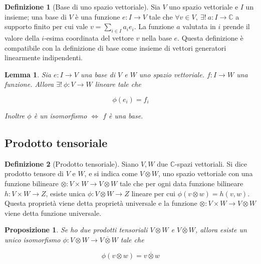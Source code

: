 \documentclass[11pt]{article}
\theoremstyle{plain}
\newtheorem{lemma}[thm]{Lemma}
\newtheorem{prop}[thm]{Proposizione}
\theoremstyle{definition}
\newtheorem{defn}{Definizione}[section]
\theoremstyle{remark}
\begin{document}
\begin{defn}[Base di uno spazio vettoriale]
Sia $V$ uno spazio vettoriale e $I$ un insieme; una base di $V$ è una funzione $e: I \to V$ tale che 
$\forall v \in V,\  \exists!\  a: I \to \mathbb{C}$ a supporto finito per cui vale $v=\sum_{i\in I}a_i e_i$. La funzione $a$ 
valutata in $i$ prende il valore della $i$-esima coordinata del vettore $v$ nella base $e$. Questa definizione è compatibile con la 
definizione di base come insieme di vettori generatori linearmente indipendenti.
\end{defn}


\begin{lemma}
 Sia $e:I\to V$ una base di $V$ e $W$ uno spazio vettoriale. $f: I \to W$ una funzione. Allora $\exists!\  \phi: V \to W$ lineare tale che

\[\phi(e_i) = f_i \]

Inoltre $\phi$ è un isomorfismo $\Leftrightarrow$ $f$ è una base.
\end{lemma}


\subsection{Prodotto tensoriale}


  


\begin{defn}[Prodotto tensoriale]
   Siano $V, W$ due $\mathbb{C}$-spazi vettoriali. Si dice prodotto tensore di $V$ e $W$, 
   e si indica come $V\otimes W$, uno spazio vettoriale con una funzione bilineare 
   $\otimes: V \times W \to V\otimes W$ tale che per ogni data funzione bilineare $h: V\times W \to  Z$,
   esiste unica $\phi: V\otimes W \to Z$ lineare per cui $\phi(v \otimes w)=h(v,w)$.
   Questa proprietà viene detta proprietà universale e la funzione $\otimes: V \times W \to V\otimes W$
   viene detta funzione universale.



\label{defn:prodotto tensoriale}
\end{defn}


\begin{prop}
Se ho due prodotti tensoriali $V \otimes W$ e $V \overline{\otimes} W$, allora esiste un unico isomorfismo 
$\phi: V \otimes W \to V \overline{\otimes} W$ tale che

\[ \phi (v\otimes w) = v \overline{\otimes} w\]
\end{prop}
\end{document}
